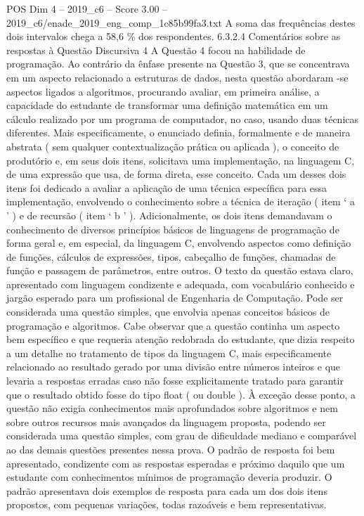 \begin{textsample}{POS Dim 4 – 2019\_c6 – Score 3.00 – 2019\_c6/enade\_2019\_eng\_comp\_1c85b99fa3.txt}
A soma das frequências destes dois intervalos chega a 58,6 \% dos respondentes. 6.3.2.4 Comentários sobre as respostas à Questão Discursiva 4 A Questão 4 focou na habilidade de programação.
Ao contrário da ênfase presente na Questão 3, que se concentrava em um aspecto relacionado a estruturas de dados, nesta questão abordaram -se aspectos ligados a algoritmos, procurando avaliar, em primeira análise, a capacidade do estudante de transformar uma definição matemática em um cálculo realizado por um programa de computador, no caso, usando duas técnicas diferentes.
Mais especificamente, o enunciado definia, formalmente e de maneira abstrata ( sem qualquer contextualização prática ou aplicada ), o conceito de produtório e, em seus dois itens, solicitava uma implementação, na linguagem C, de uma expressão que usa, de forma direta, esse conceito.
Cada um desses dois itens foi dedicado a avaliar a aplicação de uma técnica específica para essa implementação, envolvendo o conhecimento sobre a técnica de iteração ( item ‘ a ’ ) e de recursão ( item ‘ b ’ ).
Adicionalmente, os dois itens demandavam o conhecimento de diversos princípios básicos de linguagens de programação de forma geral e, em especial, da linguagem C, envolvendo aspectos como definição de funções, cálculos de expressões, tipos, cabeçalho de funções, chamadas de função e passagem de parâmetros, entre outros.
O texto da questão estava claro, apresentado com linguagem condizente e adequada, com vocabulário conhecido e jargão esperado para um profissional de Engenharia de Computação.
Pode ser considerada uma questão simples, que envolvia apenas conceitos básicos de programação e algoritmos.
Cabe observar que a questão continha um aspecto bem específico e que requeria atenção redobrada do estudante, que dizia respeito a um detalhe no tratamento de tipos da linguagem C, mais especificamente relacionado ao resultado gerado por uma divisão entre números inteiros e que levaria a respostas erradas caso não fosse explicitamente tratado para garantir que o resultado obtido fosse do tipo float ( ou double ).
À exceção desse ponto, a questão não exigia conhecimentos mais aprofundados sobre algoritmos e nem sobre outros recursos mais avançados da linguagem proposta, podendo ser considerada uma questão simples, com grau de dificuldade mediano e comparável ao das demais questões presentes nessa prova.
O padrão de resposta foi bem apresentado, condizente com as respostas esperadas e próximo daquilo que um estudante com conhecimentos mínimos de programação deveria produzir.
O padrão apresentava dois exemplos de resposta para cada um dos dois itens propostos, com pequenas variações, todas razoáveis e bem representativas.

\end{textsample}
